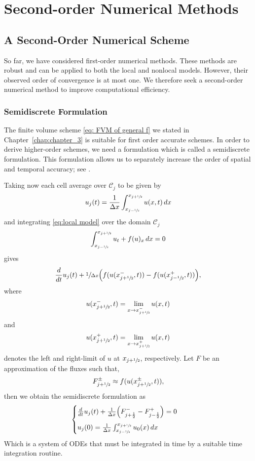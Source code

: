 \part{Second-order Numerical Methods}
\chapter{A Second-Order Numerical Scheme}\label{chap:chapter_6}
So far, we have considered first-order numerical methods. These methods are robust and can be applied to both the local and nonlocal models. However, their observed order of convergence is at most one. We therefore seek a second-order numerical method to improve computational efficiency.
\section{Semidiscrete Formulation}
The finite volume scheme \eqref{eq: FVM of general f} we stated in Chapter~\ref{chap:chapter_3} is suitable for first order accurate schemes. In order to derive higher-order schemes, we need a formulation which is called a semidiscrete formulation. This formulation allows us to separately increase the order of spatial and temporal accuracy; see \cite[Chapter~5]{Ulrik2015}.

Taking now each cell average over $\mathcal{C}_j$ to be given by
\begin{equation}
    \begin{split}
        u_j(t) = \frac{1}{\Delta x}\int_{x_{j-\sfrac{1}{2}}}^{x_{j+\sfrac{1}{2}}} u(x,t) \,dx
    \end{split}
\end{equation}
and integrating \eqref{eq:local model} over the domain $\mathcal{C}_j$
\begin{align*}
    \int_{x_{j-\sfrac{1}{2}}}^{x_{j+\sfrac{1}{2}}} u_{t} + f(u)_{x} \,dx  = 0
\end{align*}
gives
\[
    \frac{d}{dt}u_j(t) + \sfrac{1}{\Delta x}\Bigl(f(u(x_{j+\sfrac12}^{-},t))- f(u(x_{j-\sfrac12}^{+},t))\Bigr),
\]
where
\[
    u(x_{j+\sfrac12}^{-},t) = \lim_{x\rightarrow x_{j+\sfrac12}^{-}} u(x,t)\]
and
\[
    u(x_{j+\sfrac12}^{+},t) = \lim_{x\rightarrow x_{j+\sfrac12}^{+}} u(x,t)
\]
denotes the left and right-limit of $u$ at $x_{j+\sfrac12}$, respectively. Let $F$ be an approximation of the fluxes such that,
\[
    F_{j+\sfrac12}^{\pm} \approx f(u(x_{j+\sfrac12}^{\pm},t)),
\]
then we obtain the semidiscrete formulation as
\begin{equation}\label{eq:semidiscrete}
    \begin{cases}
        \frac{d}{dt}u_j(t) + \frac{1}{\Delta x}\Bigl(F_{j+\frac12}^{-}- F_{j-\frac12}^{+}\Bigr) = 0 \\[2ex]
        u_j(0)= \frac{1}{\Delta x} \int_{x_{j-\sfrac12}}^{x_{j+\sfrac12}} u_0(x) \, dx
    \end{cases}
\end{equation}
Which is a system of ODEs that must be integrated in time by a suitable time integration
routine.
